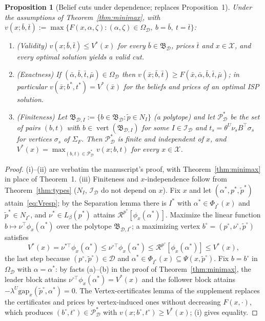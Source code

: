 \documentclass[11pt]{article}
\newtheorem{proposition}{Proposition}
\theoremstyle{definition}
\theoremstyle{remark}
\newcommand{\X}{\mathcal{X}}
\newcommand{\D}{\mathcal{D}}
\newcommand{\tp}{\tilde{p}}
\newcommand{\B}{\mathfrak{B}}
\newcommand{\R}{\mathcal{R}}
\newcommand{\gap}{\mathrm{gap}}
\DeclareMathOperator{\vertex}{vert}
\begin{document}
\begin{proposition}[Belief cuts under dependence; replaces Proposition~1]\label{prop:belief}
Under the assumptions of Theorem~\ref{thm:minimax}, with $v(x;\bar b,\bar t):=\max\{F(x,\alpha,\zeta):(\alpha,\zeta)\in\Omega_\D,\ b=\bar b,\ t=\bar t\}$:
\begin{enumerate}[label=(\roman*),nosep]
\item (Validity) $v(x;\bar b,\bar t)\le V^*(x)$ for every $\bar b\in\B_\D$, prices $\bar t$ and $x\in\X$, and every optimal solution yields a valid cut.
\item (Exactness) If $(\bar\alpha,\bar b,\bar t,\bar\mu)\in\Omega_\D$ then $v(\bar x;\bar b,\bar t)\ge F(\bar x,\bar\alpha,\bar b,\bar t,\bar\mu)$; in particular $v(\bar x;b^*,t^*)=V^*(\bar x)$ for the beliefs and prices of an optimal ISP solution.
\item (Finiteness) Let $\B_{\D,I}:=\{b\in\B_\D:\tp\in N_I\}$ (a polytope) and let $\mathcal P^*_\D$ be the set of pairs $(b,t)$ with $b\in\vertex(\B_{\D,I})$ for some $I\in\mathcal I_\D$ and $t_s=\theta^U\nu_sB^\top\sigma_s$ for vertices $\sigma_s$ of $\Sigma_F$. Then $\mathcal P^*_\D$ is finite and independent of $x$, and $V^*(x)=\max_{(b,t)\in\mathcal P^*_\D}v(x;b,t)$ for every $x\in\X$.
\end{enumerate}
\end{proposition}
\begin{proof}
(i)--(ii) are verbatim the manuscript's proof, with Theorem~\ref{thm:minimax} in place of Theorem~1.
(iii) Finiteness and $x$-independence follow from Theorem~\ref{thm:types} ($N_I$, $\mathcal I_\D$ do not depend on $x$). Fix $x$ and let $(\alpha^*,p^*,\tp^*)$ attain~\eqref{eq:Vresp}; by the Separation lemma there is $I^*$ with $\alpha^*\in\Phi_{I^*}(x)$ and $\tp^*\in N_{I^*}$, and $\nu^*\in L_\beta(p^*)$ attains $\R^{p^*}[\phi_x(\alpha^*)]$. Maximize the linear function $b\mapsto\nu^\top\phi_x(\alpha^*)$ over the polytope $\B_{\D,I^*}$; a maximizing vertex $b^\circ=(p^\circ,\nu^\circ,\tp^\circ)$ satisfies
\[
  V^*(x)=\nu^{*\top}\phi_x(\alpha^*)\le\nu^{\circ\top}\phi_x(\alpha^*)\le\R^{p^\circ}[\phi_x(\alpha^*)]\le V^*(x),
\]
the last step because $(p^\circ,\tp^\circ)\in\D$ and $\alpha^*\in\Phi_{I^*}(x)\subseteq\Psi(x,\tp^\circ)$. Fix $b=b^\circ$ in $\Omega_\D$ with $\alpha=\alpha^*$: by facts (a)--(b) in the proof of Theorem~\ref{thm:minimax}, the leader block attains $\nu^{\circ\top}\phi_x(\alpha^*)=V^*(x)$ and the follower block attains $-\lambda^U\gap_x(\tp^\circ,\alpha^*)=0$. The Vertex-certificates lemma of the supplement replaces the certificates and prices by vertex-induced ones without decreasing $F(x,\cdot)$, which produces $(b^\circ,t^\circ)\in\mathcal P^*_\D$ with $v(x;b^\circ,t^\circ)\ge V^*(x)$; (i) gives equality.
\end{proof}
\end{document}
